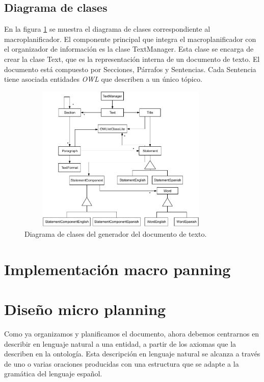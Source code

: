 \subsection{Diagrama de clases}
En la figura \ref{fig:diagrama_clases_macroplanificador} se muestra el diagrama de clases correspondiente al macroplanificador. El componente principal que integra el macroplanificador con el organizador de información es la clase TextManager. Esta clase se encarga de crear la clase Text, que es la representación interna de un documento de texto. El documento está compuesto por Secciones, Párrafos y Sentencias. Cada Sentencia tiene asociada entidades \emph{OWL} que describen a un único tópico.

\begin{figure}[H]
    \centering
    \includegraphics[width=10cm, height=7cm]{img/generacion_documento/diagrama_clases_macroplanificador.pdf}
    \caption{Diagrama de clases del generador del documento de texto.}
    \label{fig:diagrama_clases_macroplanificador}
\end{figure}

\section{Implementación macro panning}

\section{Diseño micro planning}

Como ya organizamos y planificamos el documento, ahora debemos centrarnos en describir en lenguaje natural a una entidad, a partir de los axiomas que la describen en la ontología. Esta descripción en lenguaje natural se alcanza a través de uno o varias oraciones producidas con una estructura que se adapte a la gramática del lenguaje español.

